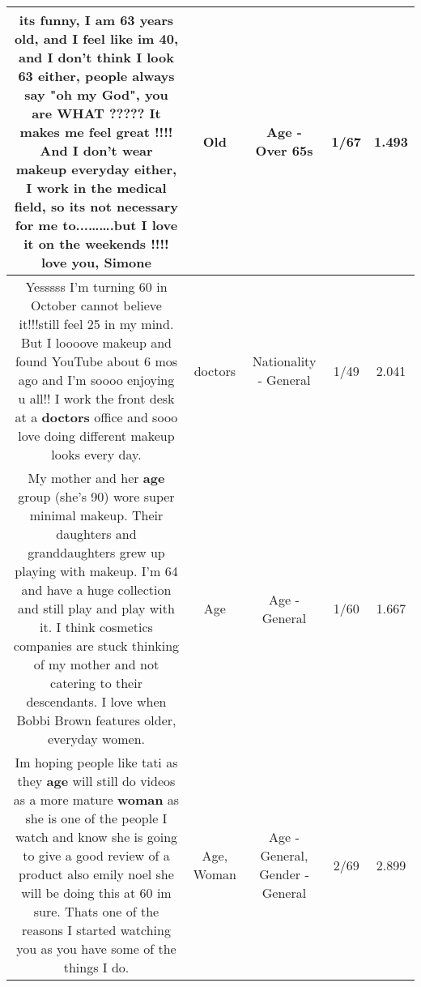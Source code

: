 \documentclass[11pt]{article}
\newlength\mylength
\begin{document}
\begin{center}
\begin{longtable}{|C{.65\mylength}|C{.30\mylength}|C{.12\mylength}|C{.12\mylength}|C{.12\mylength}|}
  \small its funny, I am 63 years \textbf{old}, and I feel like im 40, and I don't think I look 63 either, people always say "oh my God", you are WHAT ?????  It makes me feel great !!!! And I don't wear makeup everyday either, I work in the medical field, so its not necessary for me to...…….but I love it on the weekends !!!! love you, Simone\normalsize   & Old & Age - Over 65s & 1/67 & 1.493 \\  \hline
  \small Yesssss I'm turning 60 in October cannot believe it!!!still feel 25 in my mind.  But I loooove makeup and found YouTube about 6 mos ago and I'm soooo enjoying u all!! I work the front desk at a \textbf{doctors} office and sooo love doing different makeup looks every day.\normalsize   & doctors & Nationality - General & 1/49 & 2.041 \\  \hline
  \small My mother and her \textbf{age} group (she's 90) wore super minimal makeup.  Their daughters and granddaughters grew up playing with makeup.  I'm 64 and have a huge collection and still play and play with it.  I think cosmetics companies are stuck thinking of my mother and not catering to their descendants.  I love when Bobbi Brown features older, everyday women.\normalsize   & Age & Age - General & 1/60 & 1.667 \\  \hline
  \small Im hoping people like tati as they \textbf{age} will still do videos as a more mature \textbf{woman} as she is one of the people I watch and know she is going to give a good review of a product also emily noel she will be doing this at 60 im sure.  Thats one of the reasons I started watching you as you have some of the things I do.\normalsize   & Age, Woman & Age - General, Gender - General & 2/69 & 2.899 \\  \hline

\end{longtable}
\end{center}
\end{document}
